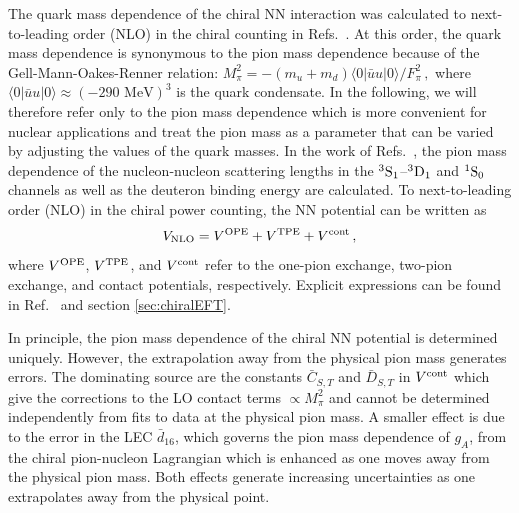 \documentclass[aps,rmp,nofootinbib,twocolumn,floatfix]{revtex4}
\newcommand{\beq}{\begin{equation}}
\newcommand{\eeq}{\end{equation}}
\newcommand{\sing}{^1{\rm S}_0}
\newcommand{\trip}{^3{\rm S}_1}
\begin{document}
The quark mass dependence of the chiral NN interaction was calculated
to next-to-leading order (NLO) in the chiral counting 
in Refs.~\cite{Beane:2002xf,Epelbaum:2002gb}.
At this order, the quark mass dependence is synonymous to
the pion mass dependence because of the Gell-Mann-Oakes-Renner relation:
$M_\pi^2 = -(m_u + m_d) \langle 0 | \bar{u} u | 0 \rangle/F_\pi^2\,,$
where $\langle 0 | \bar{u} u | 0 \rangle \approx (-290 \mbox{ MeV})^3$
is the quark condensate. In the following, we will therefore refer
only to the pion mass dependence which is more convenient for 
nuclear applications and treat the pion mass as a parameter that can be
varied by adjusting the values of the quark masses.
In the work of Refs.~\cite{Beane:2001bc,Beane:2002xf,Epelbaum:2002gb},
the pion mass dependence of the nucleon-nucleon scattering lengths in the 
$\trip$--$^3{\rm D}_1$ and $\sing$ channels
as well as the deuteron binding energy are calculated.
To next-to-leading order (NLO) in the chiral power counting,
the NN potential can be written as
\beq
V_{\rm NLO} = V^{\rm OPE} + V^{\rm TPE} + V^{\rm cont}\,,
\eeq
where $V^{\rm OPE}$, $ V^{\rm TPE}$, and  $V^{\rm cont}$
refer to the one-pion exchange, two-pion exchange, and contact potentials,
respectively. Explicit expressions can be found in 
Ref.~\cite{Epelbaum:2002gb} and section \ref{sec:chiralEFT}.  

In principle, the pion mass dependence of the
chiral NN potential is determined uniquely. 
However, the extrapolation away from the 
physical pion mass generates errors. The dominating source are the
constants  $\bar C_{S,T}$ and $\bar D_{S,T}$ in $V^{\rm cont}$
which give the corrections to the LO contact terms $\propto M_\pi^2$
and cannot be determined
independently from fits to data at the physical pion mass.
A smaller effect is due to the error in the LEC $\bar d_{16}$, which
governs the pion  mass dependence of $g_A$, 
from the chiral pion-nucleon Lagrangian which is enhanced
as one moves away from the physical pion mass. Both effects generate
increasing uncertainties as one extrapolates away from the physical point.
\end{document}
